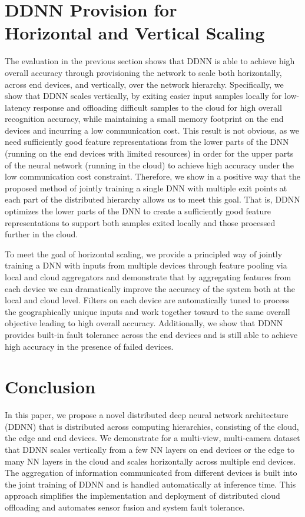 \documentclass[10pt, conference, compsocconf]{IEEEtran}
\begin{document}
\section{DDNN Provision for\\Horizontal and Vertical Scaling}
The evaluation in the previous section shows that DDNN is able to achieve high overall accuracy through provisioning the network to scale both horizontally, across end devices, and vertically, over the network hierarchy. Specifically, we show that DDNN scales vertically, by exiting easier input samples locally for low-latency response and offloading difficult samples to the cloud for high overall recognition accuracy, while maintaining a small memory footprint on the end devices and incurring a low communication cost. This result is not obvious, as we need sufficiently good feature representations from the lower parts of the DNN (running on the end devices with limited resources) in order for the upper parts of the neural network (running in the cloud) to achieve high accuracy under the low communication cost constraint. Therefore, we show in a positive way that the proposed method of jointly training a single DNN with multiple exit points at each part of the distributed hierarchy allows us to meet this goal. That is, DDNN optimizes the lower parts of the DNN to create a sufficiently good feature representations to support both samples exited locally and those processed further in the cloud.

To meet the goal of horizontal scaling, we provide a principled way of jointly training a DNN with inputs from multiple devices through feature pooling via local and cloud aggregators and demonstrate that by aggregating features from each device we can dramatically improve the accuracy of the system both at the local and cloud level. Filters on each device are automatically tuned to process the geographically unique inputs and work together toward to the same overall objective leading to high overall accuracy. Additionally, we show that DDNN provides built-in fault tolerance across the end devices and is still able to achieve high accuracy in the presence of failed devices. 

\section{Conclusion}
In this paper, we propose a novel distributed deep neural network architecture (DDNN) that is distributed across computing hierarchies, consisting of the cloud, the edge and end devices. We demonstrate for a multi-view, multi-camera dataset that DDNN scales vertically from a few NN layers on end devices or the edge to many NN layers in the cloud and scales horizontally across multiple end devices. The aggregation of information communicated from different devices is built into the joint training of DDNN and is handled automatically at inference time. This approach simplifies the implementation and deployment of distributed cloud offloading and automates sensor fusion and system fault tolerance.
\end{document}
